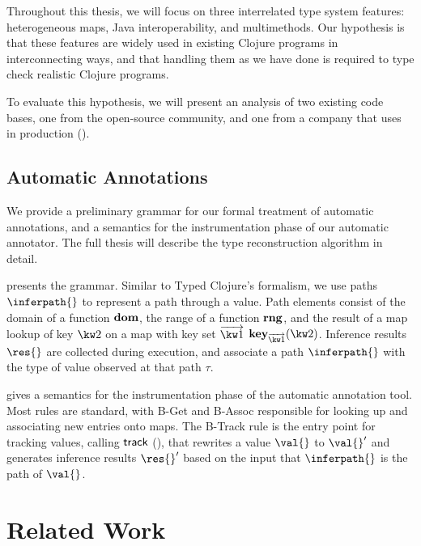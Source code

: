 \documentclass[9pt]{extarticle}
\begin{document}
Throughout this thesis, we will focus on three interrelated type
system features: heterogeneous maps, Java interoperability, and
multimethods. Our hypothesis is that these features are widely used in
existing Clojure programs in interconnecting ways, and that handling
them as we have done is required to type check realistic Clojure
programs.

To evaluate this hypothesis, we will present an analysis of two existing \coretyped{}
code bases, one from the open-source community, and one from a company
that uses \coretyped{} in production ().


\subsection{Automatic Annotations}

We provide a preliminary grammar for our formal treatment of automatic
annotations, and a semantics for the instrumentation phase
of our automatic annotator.
The full thesis will describe the type reconstruction algorithm in
detail.

 presents the grammar. Similar to Typed Clojure's
formalism, we use paths $\inferpath{}$ to represent a path through
a value. Path elements consist of the domain of a function $\textbf{dom}{}$,
the range of a function $\textbf{rng}{}$, and the result of a map lookup 
of key ${\kw2{}}$ on a map with key set ${\overrightarrow{\kw1{}}}$
$\inferkeype{\overrightarrow{\kw1{}}}{\kw2{}}$.
Inference results $\res{}$ are collected during execution, and
associate a path $\inferpath{}$ with the type of value observed
at that path $\tau$.

 gives a semantics for the instrumentation
phase of the automatic annotation tool.
Most rules are standard, with B-Get and B-Assoc responsible for
looking up and associating new entries onto maps.
The B-Track rule is the entry point for tracking values,
calling $\mathsf{track}{}$ (), that
rewrites a value $\val{}$ to $\val{}'$ and generates inference
results $\res{}'$ based on the input that $\inferpath{}$
is the path of $\val{}$.





\section{Related Work}
\end{document}
